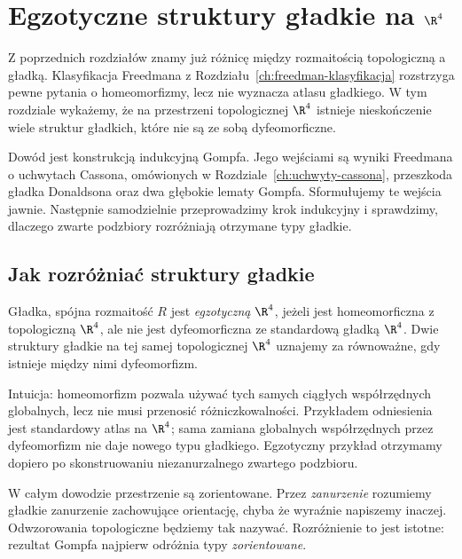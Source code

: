 \chapter{Egzotyczne struktury gładkie na \texorpdfstring{$\R^4$}{R4}}
\label{ch:egzotyczne-r4}

Z poprzednich rozdziałów znamy już różnicę między
rozmaitością topologiczną a gładką. Klasyfikacja
Freedmana z Rozdziału~\ref{ch:freedman-klasyfikacja}
rozstrzyga pewne pytania o homeomorfizmy, lecz nie
wyznacza atlasu gładkiego. W tym rozdziale wykażemy,
że na przestrzeni topologicznej $\R^4$ istnieje
nieskończenie wiele struktur gładkich, które nie są
ze sobą dyfeomorficzne.

Dowód jest konstrukcją indukcyjną Gompfa. Jego
wejściami są wyniki Freedmana o uchwytach Cassona,
omówionych w Rozdziale~\ref{ch:uchwyty-cassona},
przeszkoda gładka Donaldsona oraz dwa głębokie
lematy Gompfa. Sformułujemy te wejścia jawnie.
Następnie samodzielnie przeprowadzimy krok
indukcyjny i sprawdzimy, dlaczego zwarte podzbiory
rozróżniają otrzymane typy gładkie.

\section{Jak rozróżniać struktury gładkie}
\label{sec:egzotyczne-r4-pojecia}

\begin{definicja}[Egzotyczna $\R^4$]
\label{def:egzotyczna-r4}
Gładka, spójna rozmaitość $R$ jest \emph{egzotyczną
$\R^4$}, jeżeli jest homeomorficzna z topologiczną
$\R^4$, ale nie jest dyfeomorficzna ze standardową
gładką $\R^4$. Dwie struktury gładkie na tej samej
topologicznej $\R^4$ uznajemy za równoważne, gdy
istnieje między nimi dyfeomorfizm.
\end{definicja}

Intuicja: homeomorfizm pozwala używać tych samych
ciągłych współrzędnych globalnych, lecz nie musi
przenosić różniczkowalności. Przykładem odniesienia
jest standardowy atlas na $\R^4$; sama zamiana
globalnych współrzędnych przez dyfeomorfizm
nie daje nowego typu gładkiego. Egzotyczny przykład
otrzymamy dopiero po skonstruowaniu niezanurzalnego
zwartego podzbioru.

W całym dowodzie przestrzenie są zorientowane.
Przez \emph{zanurzenie} rozumiemy gładkie zanurzenie
zachowujące orientację, chyba że wyraźnie napiszemy
inaczej. Odwzorowania topologiczne będziemy tak
nazywać. Rozróżnienie to jest istotne: rezultat
Gompfa najpierw odróżnia typy \emph{zorientowane}.

